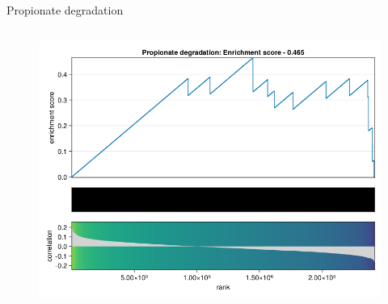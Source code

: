 \begin{frame}{Propionate degradation}
    \begin{columns}[c] %

        \begin{figure}
            \includegraphics[width=1\linewidth]{../figures/fsea_Propionate-degradation.png}
        \end{figure}

    \end{columns}

\end{frame}


